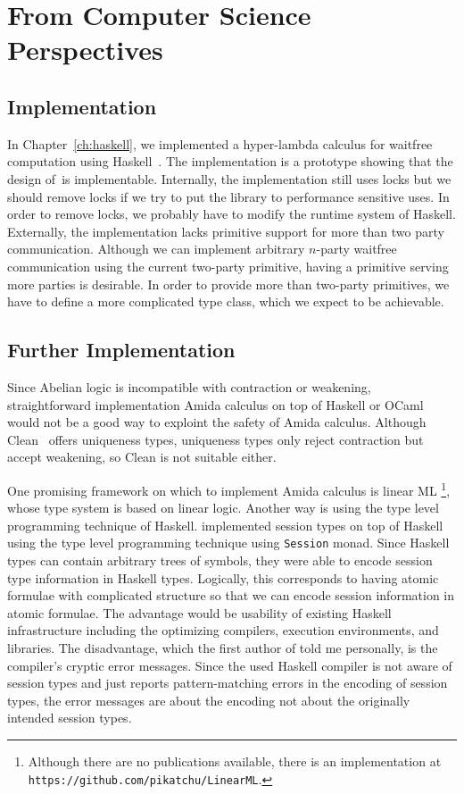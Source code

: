 \section{From Computer Science Perspectives}

\subsection{Implementation}

In Chapter~\ref{ch:haskell}, we implemented a hyper-lambda calculus for
waitfree computation using Haskell~\citep{marlow2010haskell}.
The implementation is a prototype showing that the design of \lgd\,is
implementable.
Internally, the implementation still uses locks but we should remove
locks if we try to put the library to performance sensitive uses.
In order to remove locks, we probably have to modify the runtime system
of Haskell.
Externally, the implementation lacks primitive support for more than two
party communication.  Although we can implement arbitrary $n$-party
waitfree communication using the current two-party primitive, having
a primitive serving more parties is desirable.
In order to provide more than two-party primitives,
we have to define a more complicated type class, which we expect to be
achievable.

\subsection{Further Implementation}

Since Abelian logic is incompatible with contraction or weakening,
straightforward implementation Amida calculus on top of Haskell or OCaml
would not be a
good way to exploint the safety of Amida calculus.
Although Clean~\citep{parle1991} offers uniqueness types,
uniqueness types only reject contraction but accept weakening, so Clean
is not suitable either.

One promising framework on which to implement Amida calculus is linear ML%
\footnote{Although there are no
publications available, there is an implementation at
\texttt{https://github.com/pikatchu/LinearML}\enspace.},
whose type system is based on linear logic.
Another way is using the type level programming technique of Haskell.
\citet{DBLP:journals/corr/abs-1110-4163} implemented session types on top
of Haskell using the type level programming technique using
\texttt{Session} monad.  Since Haskell types can contain arbitrary trees
of symbols, they were able to encode session type information in Haskell
types.
Logically, this corresponds to having atomic formulae with complicated
structure so that we can encode session information in atomic formulae.
The advantage would be usability of existing Haskell infrastructure
including the optimizing compilers, execution environments, and
libraries.
The disadvantage, which the first author of
\citep{DBLP:journals/corr/abs-1110-4163} told me personally,
is the compiler's cryptic error messages.
Since the used Haskell compiler is not aware of session types and just reports
pattern-matching errors in the encoding of session types, the error
messages are about the encoding not about the originally intended
session types.

